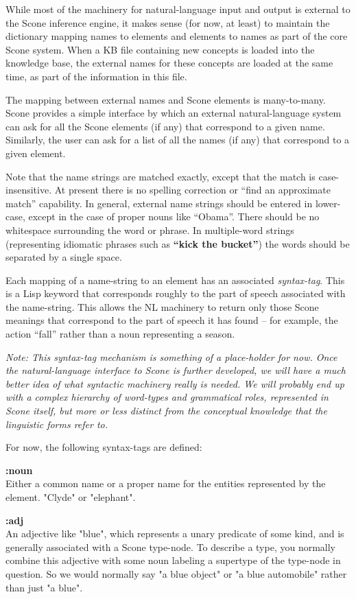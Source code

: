 \documentclass[titlepage,twoside,openright,11pt]{article}
\begin{document}
While most of the machinery for natural-language input and output is
external to the Scone inference engine, it makes sense (for now, at
least) to maintain the dictionary mapping names to elements and elements
to names as part of the core Scone system. When a KB file containing new
concepts is loaded into the knowledge base, the external names for these
concepts are loaded at the same time, as part of the information in this
file.

The mapping between external names and Scone elements is many-to-many.
Scone provides a simple interface by which an external natural-language
system can ask for all the Scone elements (if any) that correspond to a
given name. Similarly, the user can ask for a list of all the names (if
any) that correspond to a given element.

Note that the name strings are matched exactly, except that the match is
case-insensitive. At present there is no spelling correction or ``find
an approximate match'' capability. In general, external name strings
should be entered in lower-case, except in the case of proper nouns like
``Obama''. There should be no whitespace surrounding the word or phrase.
In multiple-word strings (representing idiomatic phrases such as
\textbf{``kick the bucket''}) the words should be separated by a single
space.

Each mapping of a name-string to an element has an associated
\emph{syntax-tag}. This is a Lisp keyword that corresponds roughly to
the part of speech associated with the name-string. This allows the NL
machinery to return only those Scone meanings that correspond to the
part of speech it has found -- for example, the action ``fall'' rather
than a noun representing a season.

\emph{Note: This syntax-tag mechanism is something of a place-holder for
now. Once the natural-language interface to Scone is further developed,
we will have a much better idea of what syntactic machinery really is
needed. We will probably end up with a complex hierarchy of word-types
and grammatical roles, represented in Scone itself, but more or less
distinct from the conceptual knowledge that the linguistic forms refer
to.}

For now, the following syntax-tags are defined:

\textbf{:noun\\
}Either a common name or a proper name for the entities represented by
the element. "Clyde" or "elephant".

\textbf{:adj\\
}An adjective like "blue", which represents a unary predicate of some
kind, and is generally associated with a Scone type-node. To describe a
type, you normally combine this adjective with some noun labeling a
supertype of the type-node in question. So we would normally say "a blue
object" or "a blue automobile" rather than just "a blue".
\end{document}
